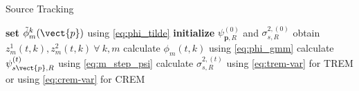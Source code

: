 \begin{algorithm}[H]
\caption{Source Tracking}
\label{alg:sourceTracking}
\begin{algorithmic}
\State \textbf{set} $\tilde\phi^k_m(\vect{p})$ using \eqref{eq:phi_tilde}
\State \textbf{initialize} $\psi_{\bm p, R}^{(0)}$ and $\sigma_{s,R}^{2,(0)}$
\State obtain $z_m^1(t,k), z_m^2(t,k)\ \forall\ k,m$
\State calculate $\phi_m(t,k)$ using \eqref{eq:phi_gmm}
\State calculate $\psi^{(t)}_{s\vect{p},R}$ using \eqref{eq:m_step_psi}
\State calculate $\sigma^{2,(t)}_{s,R}$ using \eqref{eq:trem-var} for TREM or using \eqref{eq:crem-var} for CREM
\EndFor
\end{algorithmic}
\end{algorithm}